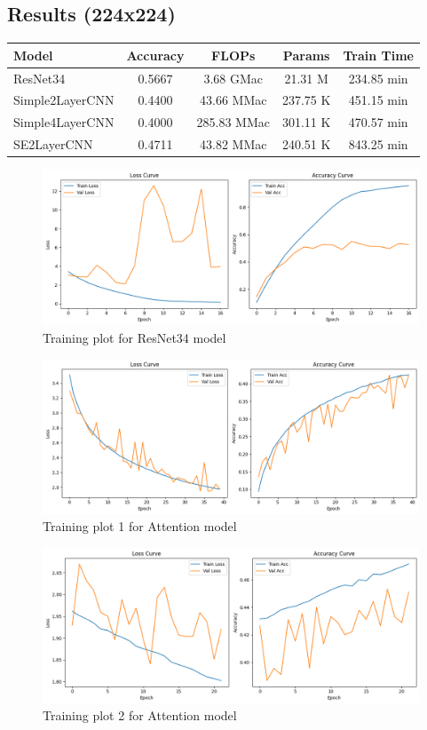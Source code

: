 \documentclass[12pt]{article}
\begin{document}
\subsection*{Results (224x224)}

\begin{center}
\begin{tabular}{lcccc}
\toprule
Model & Accuracy & FLOPs & Params & Train Time \\
\midrule
ResNet34 & 0.5667 & 3.68 GMac & 21.31 M & 234.85 min \\
Simple2LayerCNN & 0.4400 & 43.66 MMac & 237.75 K & 451.15 min \\
Simple4LayerCNN & 0.4000 & 285.83 MMac & 301.11 K & 470.57 min \\
SE2LayerCNN & 0.4711 & 43.82 MMac & 240.51 K & 843.25 min \\
\bottomrule
\end{tabular}
\end{center}





\begin{figure}[H]
\centering
\includegraphics[width=0.8\linewidth]{results/ResNet34.png}
\caption{Training plot for ResNet34 model}
\end{figure}

\begin{figure}[H]
\centering
\includegraphics[width=0.8\linewidth]{results/Attention1.png}
\caption{Training plot 1 for Attention model}
\end{figure}


\begin{figure}[H]
\centering
\includegraphics[width=0.8\linewidth]{results/Attention2.png}
\caption{Training plot 2 for Attention model}
\end{figure}
\end{document}
